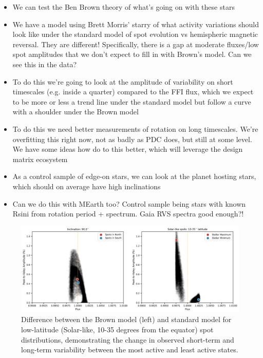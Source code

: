 \documentclass[twocolumn,dvipsnames]{aastex631}
\begin{document}
\begin{itemize}

\item{We can test the Ben Brown theory of what's going on with these stars}
\item{We have a model using Brett Morris' starry of what activity variations should look like under the
standard model of spot evolution vs hemispheric magnetic reversal. They are different!
Specifically, there is a gap at moderate fluxes/low spot amplitudes that we don't expect to fill in with Brown's model. Can we see this in the data?}
\item{To do this we're going to look at the amplitude of variability on short timescales (e.g. inside a quarter) compared to the FFI flux, which we expect to be more or less a trend line under the standard model but follow a curve with a shoulder under the Brown model}
\item{To do this we need better measurements of rotation on long timescales. We're overfitting this right now, not as badly as PDC does, but still at some level. We have some ideas how do to this better, which will leverage the design matrix ecosystem}
\item{As a control sample of edge-on stars, we can look at the planet hosting stars, which should on average have high inclinations}
\item{Can we do this with MEarth too? Control sample being stars with known Rsini from rotation period + spectrum. Gaia RVS spectra good enough?!}

\end{itemize}

\begin{figure}
    \centering
    \includegraphics[width=1.0\textwidth]{figures/fleck_solar_like.png}
    \caption{Difference between the Brown model (left) and standard model for low-latitude (Solar-like, 10-35 degrees from the equator) spot distributions, demonstrating the change in observed short-term and long-term variability between the most active and least active states.}
    \label{fig:fleck}
\end{figure}
\end{document}
